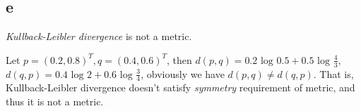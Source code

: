 \documentclass[a4paper,11pt]{article}
\theoremstyle{mytheor}
\begin{document}
\subsection*{e}
\textit{Kullback-Leibler divergence} is not a metric. 

Let $p = (0.2, 0.8)^T, q = (0.4, 0.6)^T$,
then $d(p,q) = 0.2 \text{ log }0.5 + 0.5\text{ log } \frac{4}{3}$, $d(q,p) = 0.4 \text{ log } 2 + 0.6 \text{ log }\frac{3}{4}$,
obviously we have $d(p,q) \neq d(q,p)$. That is, Kullback-Leibler divergence doesn't satisfy 
\textit{symmetry} requirement of metric, and thus it is not a metric.
\end{document}

